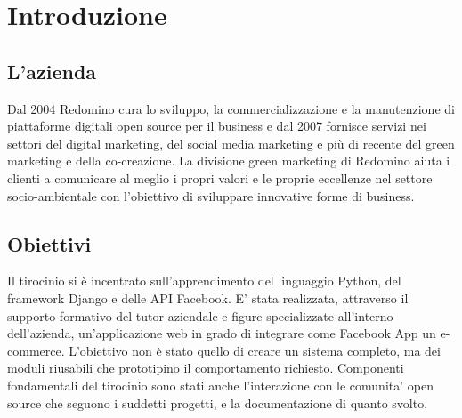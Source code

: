 \chapter{Introduzione}

\section{L'azienda}
Dal 2004 Redomino cura lo sviluppo, la commercializzazione e la manutenzione di piattaforme digitali open source per il business e dal 2007 fornisce servizi nei settori del digital marketing, del social media marketing e più di recente del green marketing e della co-creazione. La divisione green marketing di Redomino aiuta i clienti a comunicare al meglio i propri valori e le proprie eccellenze nel settore socio-ambientale con l'obiettivo di sviluppare innovative forme di business.

\section{Obiettivi}
Il tirocinio si è incentrato sull'apprendimento del linguaggio Python, del framework Django e delle API Facebook. 
E' stata realizzata, attraverso il supporto formativo del tutor aziendale e figure specializzate all'interno dell'azienda, un'applicazione web in grado di integrare come Facebook App un e-commerce. 
L'obiettivo non è stato quello di creare un sistema completo, ma dei moduli riusabili che prototipino il comportamento richiesto. 
Componenti fondamentali del tirocinio sono stati anche l'interazione con le comunita' open source che seguono i suddetti progetti, e la documentazione di quanto svolto.

